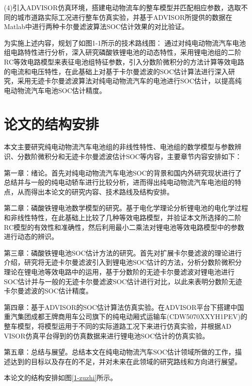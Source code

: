 (4)引入ADVISOR仿真环境，搭建电动物流车的整车模型并匹配相应参数，选取不同的城市道路实际工况进行整车仿真实验，并基于ADVISOR所提供的数据在Matlab中进行两种卡尔曼滤波算法SOC估计效果的对比验证。


为实施上述内容，规划了如图1-1所示的技术路线图：
通过对纯电动物流汽车电池组电路特性进行分析，深入研究磷酸铁锂电池的动态特性，采用锂电池组的二阶RC等效电路模型来表征电池组特征参数，引入分数阶微积分的方法计算等效电路的电流和电压特性，在此基础上对基于卡尔曼滤波的SOC估计算法进行深入研究，采用无迹卡尔曼滤波算法对纯电动物流汽车的电池进行SOC估计，以提高纯电动物流汽车电池SOC估计精度。
\section{论文的结构安排}
本文主要研究纯电动物流汽车电池组的非线性特性、电池组的数学模型与参数辨识、分数阶微积分和无迹卡尔曼滤波估计SOC等内容，主要章节内容安排如下：

第一章：绪论。首先对纯电动物流汽车电池SOC的背景和国内外研究现状进行了总结并与一般的纯电动轿车进行比较分析，进而得出纯电动物流汽车电池组的特点，从而得出本论文的研究内容、技术路线及结构安排。

第二章：磷酸铁锂电池数学模型的研究。基于电化学理论分析锂电池的电化学过程和非线性特性，在此基础上比较了几种等效电路模型，并验证本文所选择的二阶RC模型的有效性和准确性，然后利用最小二乘法对锂电池等效电路模型中的参数进行动态的辨识。

第三章：磷酸铁锂电池SOC估计方法的研究。首先对扩展卡尔曼滤波的理论进行介绍，研究将无迹卡尔曼滤波引入到锂电池SOC估计的方法，分析分数阶微积分理论在锂电池等效电路中的运用，基于分数阶的无迹卡尔曼滤波对锂电池进行SOC估计并与一般的无迹卡尔曼滤波SOC估计进行对比，以此来表明分数阶无迹卡尔曼滤波的SOC估计精度。

第四章：基于ADVISOR的SOC估计算法仿真实验。在ADVISOR平台下搭建中国重汽集团成都王牌商用车公司旗下的纯电动厢式运输车(CDW5070XXYH1PE\linebreak{}V)的整车模型，将模型运用于不同的实际道路工况下来进行仿真实验，并根据AD\\VISOR仿真平台得到的仿真数据来进行锂电池SOC估计的仿真实验。

第五章：总结与展望。总结本文在纯电动物流汽车SOC估计领域所做的工作，描述达到的目标以及存在的不足，并对未来在此领域的研究路线和方向进行展望。

本论文的结构安排如图\ref{1-zuzhi}所示。
	

	
	
